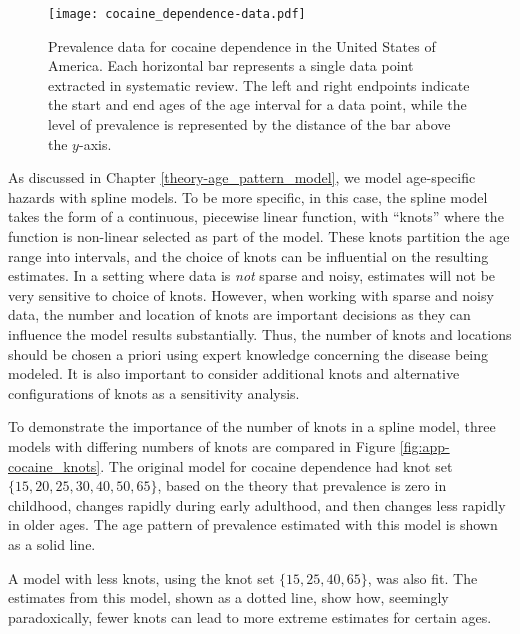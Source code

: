     \begin{figure}[h]
        \begin{center}
            \texttt{[image: cocaine\_dependence-data.pdf]}
            \caption{Prevalence data for cocaine dependence in the
              United States of America. Each horizontal bar represents
              a single data point extracted in systematic review.  The
              left and right endpoints indicate the start and end ages
              of the age interval for a data point, while the level of
              prevalence is represented by the distance of the bar
              above the $y$-axis.}
            \label{fig:app-cocaine_data}
        \end{center}
    \end{figure}

As discussed in Chapter \ref{theory-age_pattern_model}, we model
age-specific hazards with spline models.  To be more specific, in this
case, the spline model takes the form of a continuous, piecewise
linear function, with ``knots'' where the function is non-linear
selected as part of the model.  These knots partition the age range
into intervals, and the choice of knots can be influential on the
resulting estimates.  In a setting where data is \emph{not} sparse and
noisy, estimates will not be very sensitive to choice of knots.
However, when working with sparse and noisy data, the number and
location of knots are important decisions as they can influence the
model results substantially.  Thus, the number of knots and locations
should be chosen a priori using expert knowledge concerning the
disease being modeled.  It is also
important to consider additional knots and alternative configurations
of knots as a sensitivity analysis.

To demonstrate the importance of the number of knots in a spline
model, three models with differing numbers of knots are compared in
Figure \ref{fig:app-cocaine_knots}.  The original model for cocaine
dependence had knot set $\{15, 20, 25, 30, 40, 50, 65\}$, based on the theory that prevalence is zero in childhood,
changes rapidly during early adulthood, and then changes less rapidly
in older ages.  The age pattern of prevalence estimated with this
model is shown as a solid line.

A model with less knots, using the knot set $\{15, 25, 40, 65\}$,
was also fit.  The estimates from this model, shown as a dotted line,
show how, seemingly paradoxically, fewer knots can lead to more
extreme estimates for certain ages.

